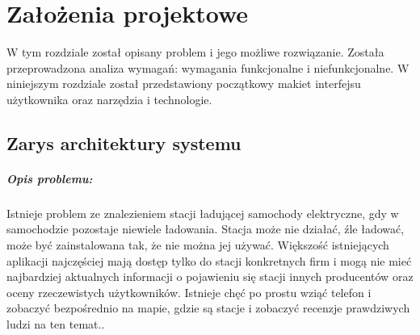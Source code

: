 \chapter{Założenia projektowe}
W tym rozdziale został opisany problem i jego możliwe rozwiązanie.
Została przeprowadzona analiza wymagań: wymagania funkcjonalne i niefunkcjonalne.
W niniejszym rozdziale został przedstawiony początkowy makiet interfejsu użytkownika oraz narzędzia i technologie.

\section{Zarys architektury systemu}



\paragraph{Opis problemu:}
Istnieje problem ze znalezieniem stacji ładującej samochody elektryczne, gdy w samochodzie pozostaje niewiele ładowania.
Stacja może nie działać, źle ładować, może być zainstalowana tak, że nie można jej używać.
Większość istniejących aplikacji najczęściej mają dostęp tylko do stacji konkretnych firm i mogą nie mieć najbardziej aktualnych informacji o pojawieniu się stacji innych producentów oraz oceny rzeczewistych użytkowników.
Istnieje chęć po prostu wziąć telefon i zobaczyć bezpośrednio na mapie, gdzie są stacje i zobaczyć recenzje prawdziwych ludzi na ten temat..

